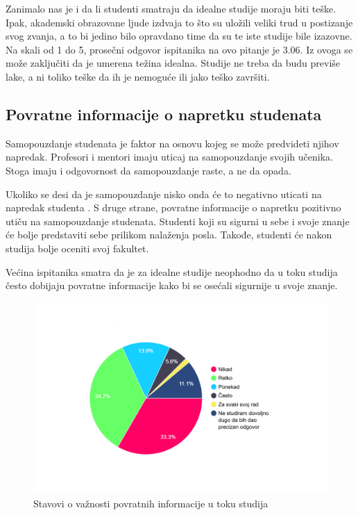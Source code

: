 \documentclass[a4paper]{article}
\begin{document}
{Zanimalo nas je i da li studenti smatraju da idealne studije moraju biti teške. Ipak, akademski obrazovane ljude izdvaja to što su uložili veliki trud u postizanje svog zvanja, a to bi jedino bilo opravdano time da su te iste studije bile izazovne. Na skali od 1 do 5, prosečni odgovor ispitanika na ovo pitanje je 3.06. Iz ovoga se može zaključiti da je umerena težina idealna. Studije ne treba da budu previše lake, a ni toliko teške da ih je nemoguće ili jako teško završiti.

\subsection{Povratne informacije o napretku studenata}
\label{subsec:povrane_informacije}

Samopouzdanje studenata je faktor na osnovu kojeg se može predvideti njihov napredak\cite{correlation}.
Profesori i mentori imaju uticaj na samopouzdanje svojih učenika. Stoga imaju i odgovornost da samopouzdanje raste, a ne da opada.

Ukoliko se desi da je samopouzdanje nisko onda će to negativno uticati na napredak studenta \cite{confidence}. S druge strane, povratne informacije o napretku pozitivno utiču na samopouzdanje studenata. Studenti koji su sigurni u sebe i svoje znanje će bolje predstaviti sebe prilikom nalaženja posla. Takođe, studenti će nakon studija bolje oceniti svoj fakultet. 

Većina ispitanika smatra da je za idealne studije neophodno da u toku studija često dobijaju povratne informacije kako bi se osećali sigurnije u svoje znanje. 
\begin{figure}[h!]
\begin{center}
    \includegraphics[width=0.7\linewidth]{Slike/PieChartPovratneInformacije.png}
    \caption{Stavovi o važnosti povratnih informacije u toku studija}
    \label{fig:povratne_informacije}
\end{center}
\end{figure}

}
\end{document}
